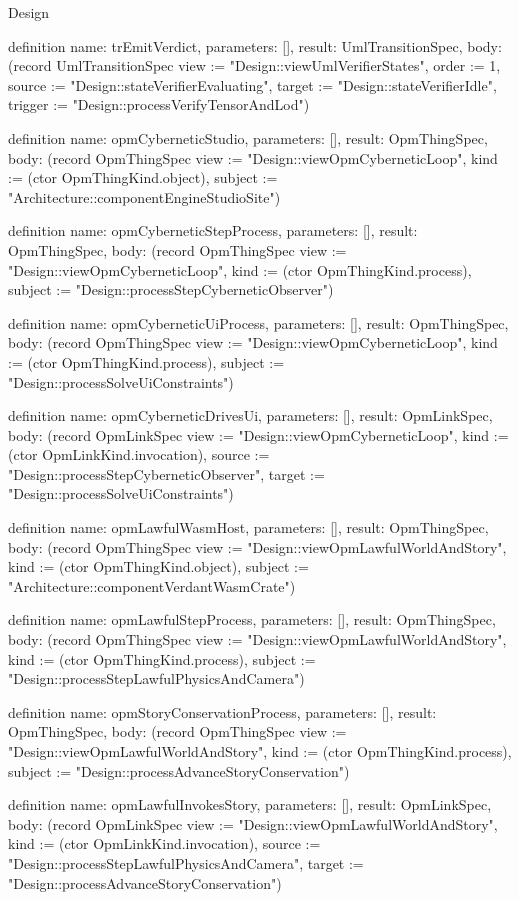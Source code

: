 \begin{lexlean}{Design}
\begin{semanticmodule}
definition{
  name: trEmitVerdict,
  parameters: [],
  result: UmlTransitionSpec,
  body: (record UmlTransitionSpec {view := "Design::viewUmlVerifierStates", order := 1, source := "Design::stateVerifierEvaluating", target := "Design::stateVerifierIdle", trigger := "Design::processVerifyTensorAndLod"})
}

definition{
  name: opmCyberneticStudio,
  parameters: [],
  result: OpmThingSpec,
  body: (record OpmThingSpec {view := "Design::viewOpmCyberneticLoop", kind := (ctor OpmThingKind.object), subject := "Architecture::componentEngineStudioSite"})
}

definition{
  name: opmCyberneticStepProcess,
  parameters: [],
  result: OpmThingSpec,
  body: (record OpmThingSpec {view := "Design::viewOpmCyberneticLoop", kind := (ctor OpmThingKind.process), subject := "Design::processStepCyberneticObserver"})
}

definition{
  name: opmCyberneticUiProcess,
  parameters: [],
  result: OpmThingSpec,
  body: (record OpmThingSpec {view := "Design::viewOpmCyberneticLoop", kind := (ctor OpmThingKind.process), subject := "Design::processSolveUiConstraints"})
}

definition{
  name: opmCyberneticDrivesUi,
  parameters: [],
  result: OpmLinkSpec,
  body: (record OpmLinkSpec {view := "Design::viewOpmCyberneticLoop", kind := (ctor OpmLinkKind.invocation), source := "Design::processStepCyberneticObserver", target := "Design::processSolveUiConstraints"})
}

definition{
  name: opmLawfulWasmHost,
  parameters: [],
  result: OpmThingSpec,
  body: (record OpmThingSpec {view := "Design::viewOpmLawfulWorldAndStory", kind := (ctor OpmThingKind.object), subject := "Architecture::componentVerdantWasmCrate"})
}

definition{
  name: opmLawfulStepProcess,
  parameters: [],
  result: OpmThingSpec,
  body: (record OpmThingSpec {view := "Design::viewOpmLawfulWorldAndStory", kind := (ctor OpmThingKind.process), subject := "Design::processStepLawfulPhysicsAndCamera"})
}

definition{
  name: opmStoryConservationProcess,
  parameters: [],
  result: OpmThingSpec,
  body: (record OpmThingSpec {view := "Design::viewOpmLawfulWorldAndStory", kind := (ctor OpmThingKind.process), subject := "Design::processAdvanceStoryConservation"})
}

definition{
  name: opmLawfulInvokesStory,
  parameters: [],
  result: OpmLinkSpec,
  body: (record OpmLinkSpec {view := "Design::viewOpmLawfulWorldAndStory", kind := (ctor OpmLinkKind.invocation), source := "Design::processStepLawfulPhysicsAndCamera", target := "Design::processAdvanceStoryConservation"})
}


\end{semanticmodule}
\end{lexlean}
